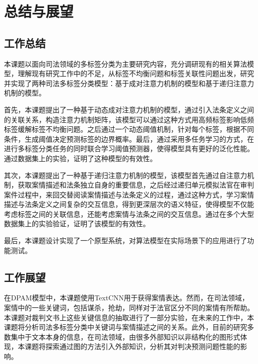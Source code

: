 
\chapter{总结与展望}
\section{工作总结}

本课题以面向司法领域的多标签分类为主要研究内容，充分调研现有的相关算法模型，理解现有研究工作中的不足，从标签不均衡问题和标签关联性问题出发，研究并实现了两种司法多标签分类模型：基于成对注意力机制的模型和基于递归注意力机制的模型。

首先，本课题提出了一种基于动态成对注意力机制的模型，通过引入法条定义之间的关联关系，构造注意力机制矩阵，该模型可以通过这种方式用高频标签影响低频标签缓解标签不均衡问题。之后通过一个动态阈值机制，针对每个标签，根据不同条件，生成阈值决定预测标签的边界概率。最后，通过采用多任务学习的方式，在进行多标签分类任务的同时联合学习阈值预测器，使得模型具有更好的泛化性能。通过数据集上的实验，证明了这种模型的有效性。

其次，本课题提出了一种基于递归注意力机制的模型，该模型首先通过自注意力机制，获取案情描述和法条独立自身的重要信息，之后经过递归单元模拟法官在审判案件过程中，来回交替阅读案情描述与法条定义的过程，通过这种方式，学习案情描述与法条定义之间复杂的交互信息，得到更深层次的语义特征，使得模型不仅能考虑标签之间的关联信息，还能考虑案情与法条之间的交互信息。通过在多个大型数据集上的实验验证，证明了该模型的有效性。

最后，本课题设计实现了一个原型系统，对算法模型在实际场景下的应用进行了功能测试。

\section{工作展望}
在DPAM模型中，本课题使用TextCNN用于获得案情表达。然而，在司法领域，案情中的一些关键词，包括谋杀，抢劫，同样对于法官区分不同的案情有所帮助。本课题对裁判文书上这些关键信息的抽取进行了一部分实验，在未来的工作中，本课题将分析司法多标签分类中关键词与案情描述之间的关系。此外，目前的研究多数集中于文本本身的信息，在司法领域，由很多外部知识以非结构化的图形式体现，本课题将探索通过图的方法引入外部知识，分析其对判决预测问题性能的影响。




